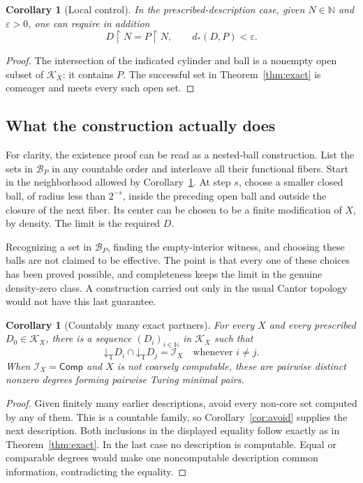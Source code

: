 \documentclass[11pt,a4paper]{article}
\newcommand{\N}{\mathbb N}
\newcommand{\Comp}{\mathsf{Comp}}
\newcommand{\Core}{\mathcal I}
\newcommand{\low}[1]{\mathord{\downarrow}_{\mathrm T}#1}
\newcommand{\dst}{d_{\!*}}
\newtheorem{corollary}[theorem]{Corollary}
\theoremstyle{definition}\newtheorem{definition}[theorem]{Definition}
\theoremstyle{remark}\newtheorem{remark}[theorem]{Remark}
\begin{document}
\begin{corollary}[Local control]\label{cor:local}
In the prescribed-description case, given $N\in\N$ and $\varepsilon>0$, one can require in addition
\[
             D\upharpoonright N=P\upharpoonright N,
             \qquad\dst(D,P)<\varepsilon.
\]
\end{corollary}
\begin{proof}
The intersection of the indicated cylinder and ball is a nonempty open subset of $\mathcal K_X$: it contains $P$. The successful set in Theorem~\ref{thm:exact} is comeager and meets every such open set.
\end{proof}

\subsection{What the construction actually does}
For clarity, the existence proof can be read as a nested-ball construction. List the sets in $\mathcal B_P$ in any countable order and interleave all their functional fibers. Start in the neighborhood allowed by Corollary~\ref{cor:local}. At step $s$, choose a smaller closed ball, of radius less than $2^{-s}$, inside the preceding open ball and outside the closure of the next fiber. Its center can be chosen to be a finite modification of $X$, by density. The limit is the required $D$.

Recognizing a set in $\mathcal B_P$, finding the empty-interior witness, and choosing these balls are not claimed to be effective. The point is that every one of these choices has been proved possible, and completeness keeps the limit in the genuine density-zero class. A construction carried out only in the usual Cantor topology would not have this last guarantee.

\begin{corollary}[Countably many exact partners]\label{cor:many}
For every $X$ and every prescribed $D_0\in\mathcal K_X$, there is a sequence $(D_i)_{i\in\N}$ in $\mathcal K_X$ such that
\[
                 \low D_i\cap\low D_j=\Core_X
                 \quad\text{whenever }i\ne j.
\]
When $\Core_X=\Comp$ and $X$ is not coarsely computable, these are pairwise distinct nonzero degrees forming pairwise Turing minimal pairs.
\end{corollary}
\begin{proof}
Given finitely many earlier descriptions, avoid every non-core set computed by any of them. This is a countable family, so Corollary~\ref{cor:avoid} supplies the next description. Both inclusions in the displayed equality follow exactly as in Theorem~\ref{thm:exact}. In the last case no description is computable. Equal or comparable degrees would make one noncomputable description common information, contradicting the equality.
\end{proof}
\end{document}

